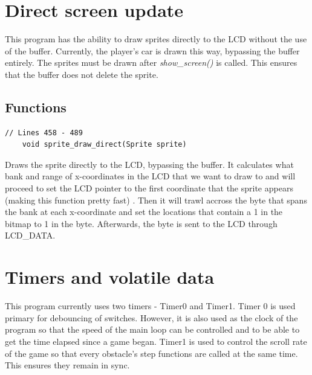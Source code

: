 \documentclass{article}
\begin{document}
\clearpage

\section{Direct screen update}
This program has the ability to draw sprites directly to the LCD without the use of the buffer. Currently, the player's car is drawn this way, bypassing the buffer entirely. 
\newline
The sprites must be drawn after \emph{show\_screen()} is called. This ensures that the buffer does not delete the sprite. 

\subsection*{Functions}
\begin{lstlisting}[style=CStyle]
	// Lines 458 - 489
	void sprite_draw_direct(Sprite sprite)
\end{lstlisting}
Draws the sprite directly to the LCD, bypassing the buffer. It calculates what bank and range of x-coordinates in the LCD that we want to draw to and will proceed to set the LCD pointer to the first coordinate that the sprite appears (making this function pretty fast) . Then it will trawl accross the byte that spans the bank at each x-coordinate and set the locations that contain a 1 in the bitmap to 1 in the byte. Afterwards, the byte is sent to the LCD through LCD\_DATA.
\clearpage

\section{Timers and volatile data}
This program currently uses two timers - Timer0 and Timer1. Timer 0 is used primary for debouncing of switches. However, it is also used as the clock of the program so that the speed of the main loop can be controlled and to be able to get the time elapsed since a game began. Timer1 is used to control the scroll rate of the game so that every obstacle's step functions are called at the same time. This ensures they remain in sync. 
\end{document}
